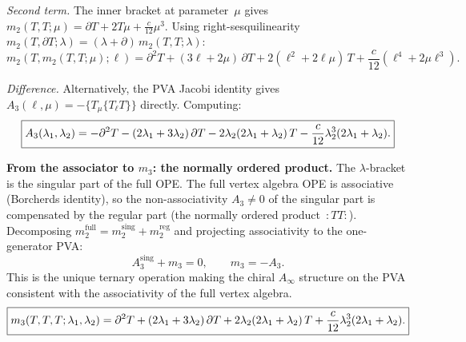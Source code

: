 \smallskip
\emph{Second term.} The inner bracket at parameter~$\mu$
gives $m_2(T,T;\mu) = \partial T + 2T\mu + \tfrac{c}{12}\mu^3$.
Using right-sesquilinearity $m_2(T,\partial T;\lambda) = (\lambda+\partial)\,m_2(T,T;\lambda)$:
\begin{equation}
m_2(T,m_2(T,T;\mu);\ell)
= \partial^2 T
 + (3\ell + 2\mu)\,\partial T
 + 2(\ell^2 + 2\ell\mu)\,T
 + \frac{c}{12}(\ell^4 + 2\mu\ell^3).
\end{equation}

\smallskip
\emph{Difference.} Alternatively, the PVA Jacobi identity gives $A_3(\ell,\mu) = -\{T_\mu\{T_\ell T\}\}$ directly. Computing:
\begin{equation}
\boxed{%
A_3(\lambda_1,\lambda_2)
= -\partial^2 T
 - (2\lambda_1 + 3\lambda_2)\,\partial T
 - 2\lambda_2(2\lambda_1 + \lambda_2)\,T
 - \frac{c}{12}\lambda_2^3(2\lambda_1 + \lambda_2).
}
\end{equation}

\medskip
\noindent\textbf{From the associator to $m_3$: the normally ordered product.}
The $\lambda$-bracket is the singular part of the full OPE\@.
The full vertex algebra OPE is associative (Borcherds identity),
so the non-associativity $A_3 \neq 0$ of the singular part
is compensated by the regular part (the normally ordered product~$:TT:$).
Decomposing $m_2^{\mathrm{full}} = m_2^{\mathrm{sing}} + m_2^{\mathrm{reg}}$
and projecting associativity to the one-generator PVA:
\[
A_3^{\mathrm{sing}} + m_3 = 0,
\qquad
m_3 = -A_3.
\]
This is the unique ternary operation making the chiral $A_\infty$ structure
on the PVA consistent with the associativity of the full vertex algebra.
\begin{equation}
\boxed{%
m_3(T,T,T;\lambda_1,\lambda_2)
= \partial^2 T
 + (2\lambda_1 + 3\lambda_2)\,\partial T
 + 2\lambda_2(2\lambda_1 + \lambda_2)\,T
 + \frac{c}{12}\lambda_2^3(2\lambda_1 + \lambda_2).
}
\end{equation}

